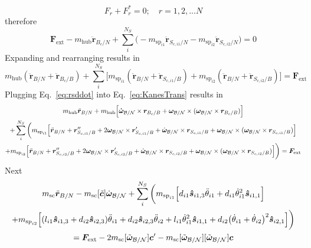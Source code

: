 \documentclass[paper]{aiaaNew}
\begin{document}
\begin{equation}
F_r + F^*_r = 0;\quad r = 1, 2, ... N
\label{eq:KanesEq}
\end{equation}
therefore
\begin{equation}
\bm F_{\text{ext}} -m_{\text{hub}} \ddot{\bm r}_{B_c/N} + \sum\limits_{i}^{N_S} \Big( -m_{\text{sp}_{i1}} \ddot{\bm{r}}_{S_{c,{i1}}/N} -m_{\text{sp}_{i2}} \ddot{\bm{r}}_{S_{c,{i2}}/N}\Big) = 0
\end{equation}
Expanding and rearranging results in
\begin{equation}
m_{\text{hub}} (\ddot{\bm r}_{B/N} + \ddot{\bm r}_{B_c/B})  + \sum\limits_{i}^{N_S} \Big[ m_{\text{sp}_{i1}} (\ddot{\bm r}_{B/N} + \ddot{\bm{r}}_{S_{c,{i1}}/B}) + m_{\text{sp}_{i2}} (\ddot{\bm r}_{B/N} + \ddot{\bm{r}}_{S_{c,{i2}}/B})\Big] = \bm F_{\text{ext}}
\label{eq:KanesTrans}
\end{equation}
Plugging Eq.~\eqref{eq:rsddot} into Eq.~\eqref{eq:KanesTrans} results in
\begin{multline}
m_{\text{hub}} \ddot{\bm r}_{B/N} + m_{\text{hub}}\Big[\bm{\dot{\omega}}_{\cal B/N} \times \bm{r}_{B_c/B} + \bm\omega_{\cal B/N} \times (\bm\omega_{\cal B/N} \times \bm{r}_{B_c/B})\Big] \\
+ \sum\limits_{i}^{N_S} \bigg( m_{\text{sp}_{i1}} \Big[\ddot{\bm r}_{B/N} + \bm{r}''_{S_{c,i1}/B} + 2 \bm\omega_{\cal B/N} \times \bm{r}'_{S_{c,i1}/B} +  \dot{\bm\omega}_{\cal B/N} \times \bm{r}_{S_{c,i1}/B} + \bm\omega_{\cal B/N} \times (\bm\omega_{\cal B/N} \times \bm{r}_{S_{c,i1}/B})\Big] \\
+ m_{\text{sp}_{i2}} \Big[\ddot{\bm r}_{B/N} + \bm{r}''_{S_{c,i2}/B} + 2 \bm\omega_{\cal B/N} \times \bm{r}'_{S_{c,i2}/B} +  \dot{\bm\omega}_{\cal B/N} \times \bm{r}_{S_{c,i2}/B} + \bm\omega_{\cal B/N} \times (\bm\omega_{\cal B/N} \times \bm{r}_{S_{c,i2}/B})\Big]\bigg) = \bm F_{\text{ext}}
\end{multline}
Next
\begin{multline}
m_{\text{sc}} \ddot{\bm r}_{B/N} -m_{\textnormal{sc}} [\tilde{\bm{c}}]\dot{\bm\omega}_{\cal B/N} 
+ \sum\limits_{i}^{N_S} \bigg( m_{\text{sp}_{i1}} \Big[d_{i1} \bm{\hat{s}}_{i1,3} \ddot{\theta}_{i1} + d_{i1} \dot{\theta}_{i1}^2 \bm{\hat{s}}_{i1,1}\Big] \\
+ m_{\text{sp}_{i2}} \Big[(l_{i1} \bm{\hat{s}}_{i1,3} + d_{i2} \bm{\hat{s}}_{i2,3}) \ddot{\theta}_{i1} + d_{i2} \bm{\hat{s}}_{i2,3} \ddot{\theta}_{i2} + l_{i1} \dot{\theta}_{i1}^2 \bm{\hat{s}}_{i1,1} + d_{i2}\big(\dot{\theta}_{i1} + \dot{\theta}_{i2}\big)^2\bm{\hat{s}}_{i2,1} \Big]\bigg) \\
= \bm F_{\text{ext}} - 2 m_{\textnormal{sc}}[\tilde{\bm\omega}_{\cal B/N}]\bm{c}' - m_{\textnormal{sc}} [\tilde{\bm\omega}_{\cal B/N}][\tilde{\bm\omega}_{\cal B/N}]\bm{c} 
\end{multline}
\end{document}
